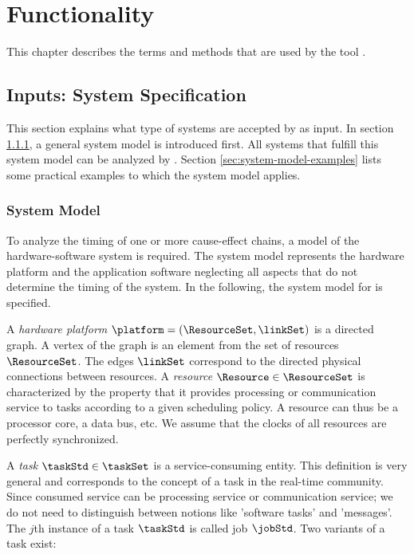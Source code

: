 \section{Functionality}
\label{sec:functionality}
%
This chapter describes the terms and methods that are used by the tool \Tool.


\subsection{Inputs: System Specification}
This section explains what type of systems are accepted by \Tool as input.
In section \ref{sec:system-model}, a general system model is introduced first. 
All systems that fulfill this system model can be analyzed by \Tool.
Section \ref{sec:system-model-examples} lists some practical examples to which the system model applies. 


\subsubsection{System Model}
\label{sec:system-model}
To analyze the timing of one or more cause-effect chains, a model of the hardware-software system is required. 
The system model represents the hardware platform and the application software neglecting all aspects that do not determine the timing of the system. 
In the following, the system model for \Tool is specified.
\bigskip

A \emph{hardware platform} $\platform = (\ResourceSet, \linkSet)$ is a directed graph.
A vertex of the graph is an element from the set of resources $\ResourceSet$.
The edges $\linkSet$ correspond to the directed physical connections between resources.
%
A \emph{resource} $\Resource \in \ResourceSet$ is characterized by the property that it provides processing or communication service to tasks according to a given scheduling policy. 
A resource can thus be a processor core, a data bus, etc.  
We assume that the clocks of all resources are perfectly synchronized. 

A \emph{task} $\taskStd \in \taskSet$ is a service-consuming entity. 
This definition is very general and corresponds to the concept of a task in the real-time community.
Since consumed service can be processing service or communication service; we do not need to distinguish between notions like 'software tasks' and 'messages'. 
The $j$th instance of a task $\taskStd$ is called job $\jobStd$.
Two variants of a task exist: 
\bigskip

